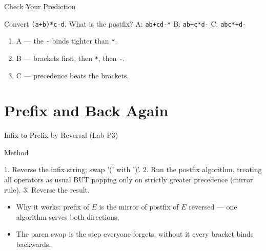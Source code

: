 \documentclass[aspectratio=169]{beamer}
\begin{document}
\begin{frame}{Check Your Prediction}
  \begin{block}{Convert \texttt{(a+b)*c-d}. What is the postfix?}
    A: \texttt{ab+cd-*} \quad B: \texttt{ab+c*d-} \quad C: \texttt{abc*+d-}
  \end{block}
  \begin{enumerate}
    \item A --- the \texttt{-} binds tighter than \texttt{*}.
    \item B --- brackets first, then \texttt{*}, then \texttt{-}.
    \item C --- precedence beats the brackets.
  \end{enumerate}
\end{frame}


\section{Prefix and Back Again}


\begin{frame}[fragile]{Infix to Prefix by Reversal (Lab P3)}
  \begin{block}{Method}
\begin{semiverbatim}
1. Reverse the infix string; swap '(' with ')'.
2. Run the postfix algorithm, treating all
   operators as usual BUT popping only on
   strictly greater precedence (mirror rule).
3. Reverse the result.
\end{semiverbatim}
  \end{block}
  \begin{itemize}
    \item Why it works: prefix of $E$ is the mirror of postfix of $E$
      reversed --- one algorithm serves both directions.
    \item The paren swap is the step everyone forgets; without it every
      bracket binds backwards.
  \end{itemize}
\end{frame}
\end{document}
